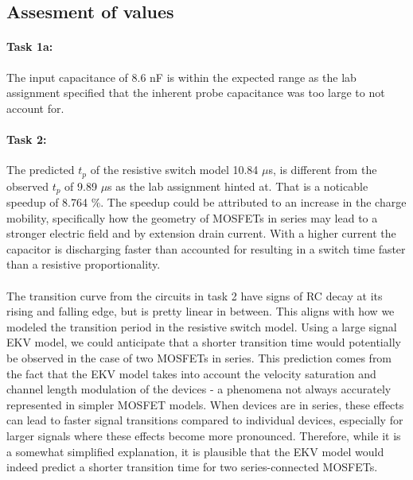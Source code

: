 \documentclass[onecolumn]{article}
\begin{document}
\subsection{Assesment of values}

\paragraph{Task 1a:} The input capacitance of 8.6 nF is within the expected range as the lab assignment specified that the inherent probe capacitance was too large to not account for. 

\paragraph{Task 2:} The predicted $t_p$ of the resistive switch model 10.84 $\mu$s, is different from the observed $t_p$ of 9.89 $\mu$s as the lab assignment hinted at. That is a noticable speedup of 8.764 \%. The speedup could be attributed to an increase in the charge mobility, specifically how the geometry of MOSFETs in series may lead to a stronger electric field and by extension drain current. With a higher current the capacitor is discharging faster than accounted for resulting in a switch time faster than a resistive proportionality.

\paragraph{} The transition curve from the circuits in task 2 have signs of RC decay at its rising and falling edge, but is pretty linear in between. This aligns with how we modeled the transition period in the resistive switch model. Using a large signal EKV model, we could anticipate that a shorter transition time would potentially be observed in the case of two MOSFETs in series. This prediction comes from the fact that the EKV model takes into account the velocity saturation and channel length modulation of the devices - a phenomena not always accurately represented in simpler MOSFET models. When devices are in series, these effects can lead to faster signal transitions compared to individual devices, especially for larger signals where these effects become more pronounced. Therefore, while it is a somewhat simplified explanation, it is plausible that the EKV model would indeed predict a shorter transition time for two series-connected MOSFETs.
\end{document}

